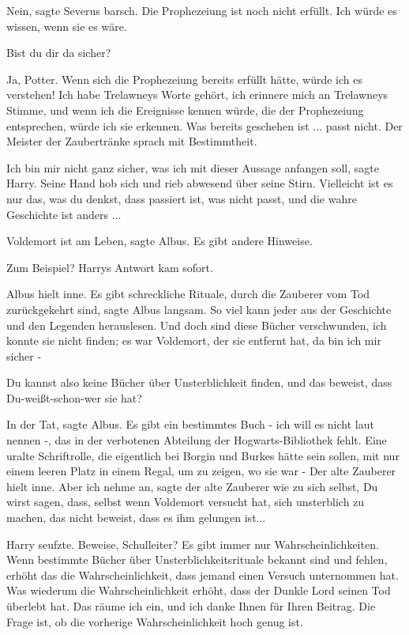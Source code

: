 \glqq Nein\grqq{}, sagte Severus barsch. \glqq Die Prophezeiung ist noch nicht
erfüllt. Ich würde es wissen, wenn sie es wäre.\grqq{}

\glqq Bist du dir da sicher?\grqq{}

\glqq Ja, Potter. Wenn sich die Prophezeiung bereits erfüllt hätte, würde ich es
verstehen! Ich habe Trelawneys Worte gehört, ich erinnere mich an Trelawneys
Stimme, und wenn ich die Ereignisse kennen würde, die der Prophezeiung
entsprechen, würde ich sie erkennen. Was bereits geschehen ist ... passt
nicht.\grqq{} Der Meister der Zaubertränke sprach mit Bestimmtheit.

\glqq Ich bin mir nicht ganz sicher, was ich mit dieser Aussage anfangen
soll\grqq{}, sagte Harry. Seine Hand hob sich und rieb abwesend über seine
Stirn. \glqq Vielleicht ist es nur das, was du denkst, dass passiert ist, was
nicht passt, und die wahre Geschichte ist anders ...\grqq{}

\glqq Voldemort ist am Leben\grqq{}, sagte Albus. \glqq Es gibt andere
Hinweise.\grqq{}

\glqq Zum Beispiel?\grqq{} Harrys Antwort kam sofort.

Albus hielt inne. \glqq Es gibt schreckliche Rituale, durch die Zauberer vom Tod
zurückgekehrt sind\grqq{}, sagte Albus langsam. \glqq So viel kann jeder aus der
Geschichte und den Legenden herauslesen. Und doch sind diese Bücher
verschwunden, ich konnte sie nicht finden; es war Voldemort, der sie entfernt
hat, da bin ich mir sicher -\grqq{}

\glqq Du kannst also keine Bücher über Unsterblichkeit finden, und das beweist,
dass Du-weißt-schon-wer sie hat?\grqq{}

\glqq In der Tat\grqq{}, sagte Albus. \glqq Es gibt ein bestimmtes Buch - ich
will es nicht laut nennen -, das in der verbotenen Abteilung der
Hogwarts-Bibliothek fehlt. Eine uralte Schriftrolle, die eigentlich bei Borgin
und Burkes hätte sein sollen, mit nur einem leeren Platz in einem Regal, um zu
zeigen, wo sie war -\grqq{} Der alte Zauberer hielt inne. \glqq Aber ich nehme
an\grqq{}, sagte der alte Zauberer wie zu sich selbst, \glqq Du wirst sagen,
dass, selbst wenn Voldemort versucht hat, sich unsterblich zu machen, das nicht
beweist, dass es ihm gelungen ist...\grqq{}

Harry seufzte. \glqq Beweise, Schulleiter? Es gibt immer nur
Wahrscheinlichkeiten. Wenn bestimmte Bücher über Unsterblichkeitsrituale bekannt
sind und fehlen, erhöht das die Wahrscheinlichkeit, dass jemand einen Versuch
unternommen hat. Was wiederum die Wahrscheinlichkeit erhöht, dass der Dunkle
Lord seinen Tod überlebt hat. Das räume ich ein, und ich danke Ihnen für Ihren
Beitrag. Die Frage ist, ob die vorherige Wahrscheinlichkeit hoch genug
ist.\grqq{}

